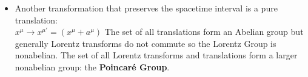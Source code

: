 \documentclass[11pt]{article}
\begin{document}
\begin{itemize}
        \[ 
            \Lambda^{\mu'}{}_{\nu'} = 
            \begin{pmatrix}
            \cosh \phi & -\sinh \phi & 0 & 0 \\
            -\sinh \phi & \cosh \phi & 0 & 0 \\
            0 & 0 & 1 & 0 \\
            0 & 0 & 0 & 1 \\
            \end{pmatrix}
        \]

        The transformed quantity for \( t' \) and \( x' \) are then \( t' = t\cosh\phi - x\sinh\phi \) and \( x' = -t\sinh\phi + x\cosh\phi \). The velocity follows as \( v = \tanh\phi \), and we can
        then rewrite in more familiar form 
        \[ 
            t' = \gamma(t - vx) 
        \]
        \[ 
            x' = \gamma(x - vt) 
        \]
        where \( \gamma = 1/\sqrt{1 - v^{2}}  \). From here, we can proceed and obtain time dilation, length contraction, etc.

        \item Another transformation that preserves the spacetime interval is a pure translation:
        \\
        \( x^{\mu} \rightarrow x^{\mu'} =( x^{\mu} + a^{\mu})\)
        The set of all translations form an Abelian group but generally Lorentz transforms do not commute so the Lorentz Group is nonabelian. The set of all Lorentz transforms and translations form a larger
        nonabelian group: the \textbf{Poincar\'e Group}.

    \end{itemize}
\end{document}
